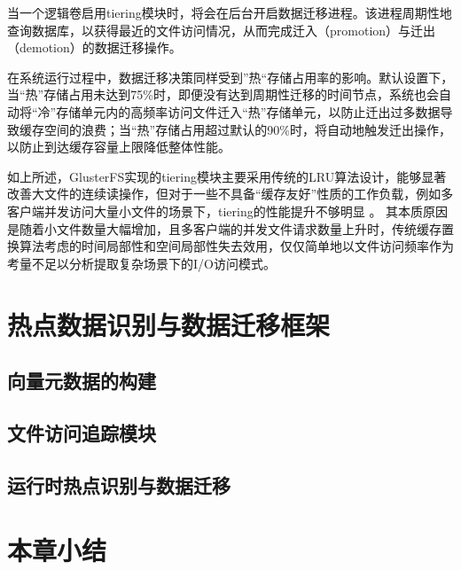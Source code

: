 当一个逻辑卷启用tiering模块时，将会在后台开启数据迁移进程。该进程周期性地查询数据库，以获得最近的文件访问情况，从而完成迁入（promotion）与迁出（demotion）的数据迁移操作。

在系统运行过程中，数据迁移决策同样受到”热“存储占用率的影响。默认设置下，当“热”存储占用未达到75\%时，即便没有达到周期性迁移的时间节点，系统也会自动将“冷”存储单元内的高频率访问文件迁入“热”存储单元，以防止迁出过多数据导致缓存空间的浪费；当“热”存储占用超过默认的90\%时，将自动地触发迁出操作，以防止到达缓存容量上限降低整体性能。

如上所述，GlusterFS实现的tiering模块主要采用传统的LRU算法设计，能够显著改善大文件的连续读操作，但对于一些不具备“缓存友好”性质的工作负载，例如多客户端并发访问大量小文件的场景下，tiering的性能提升不够明显
\cite{Red_Hat_Gluster_storage_on_supermicro_storage_servers_powered_by_Intel_Xeon_processors}。
其本质原因是随着小文件数量大幅增加，且多客户端的并发文件请求数量上升时，传统缓存置换算法考虑的时间局部性和空间局部性失去效用，仅仅简单地以文件访问频率作为考量不足以分析提取复杂场景下的I/O访问模式。


\section{热点数据识别与数据迁移框架}
\subsection{向量元数据的构建}
\subsection{文件访问追踪模块}
\subsection{运行时热点识别与数据迁移}

\section{本章小结}
